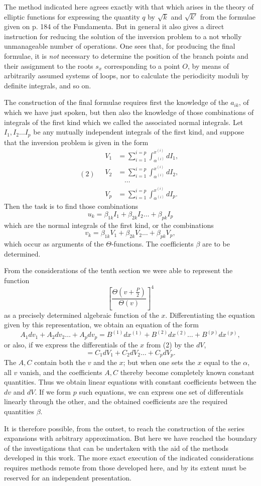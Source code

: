 \documentclass[10pt]{article}
\begin{document}
The method indicated here agrees exactly with that which arises in the theory of elliptic functions for expressing the quantity \(q\) by \(\sqrt{k}\) and \(\sqrt{k'}\) from the formulae given on p. 184 of the Fundamenta. But in general it also gives a direct instruction for reducing the solution of the inversion problem to a not wholly unmanageable number of operations. One sees that, for producing the final formulae, it is \emph{not} necessary to determine the position of the branch points and their assignment to the roots \(s_x\) corresponding to a point \(O\), by means of arbitrarily assumed systems of loops, nor to calculate the periodicity moduli by definite integrals, and so on.

The construction of the final formulae requires first the knowledge of the \(a_{ik}\), of which we have just spoken, but then also the knowledge of those combinations of integrals of the first kind which we called the associated normal integrals. Let \(I_1,I_2\ldots I_p\) be any mutually independent integrals of the first kind, and suppose that the inversion problem is given in the form
\[
(2)\quad
\begin{aligned}
V_1&=\sum_{i=1}^{i=p}\int_{\alpha^{(i)}}^{x^{(i)}}dI_1,\\
V_2&=\sum_{i=1}^{i=p}\int_{\alpha^{(i)}}^{x^{(i)}}dI_2,\\[-0.25em]
&\quad\cdots\\[-0.25em]
V_p&=\sum_{i=1}^{i=p}\int_{\alpha^{(i)}}^{x^{(i)}}dI_p.
\end{aligned}
\]
Then the task is to find those combinations
\[
u_k=\beta_{1k}I_1+\beta_{2k}I_2\ldots+\beta_{pk}I_p
\]
which are the normal integrals of the first kind, or the combinations
\[
v_k=\beta_{1k}V_1+\beta_{2k}V_2\ldots+\beta_{pk}V_p,
\]
which occur as arguments of the \(\Theta\)-functions. The coefficients \(\beta\) are to be determined.

From the considerations of the tenth section we were able to represent the function
\[
\left[\frac{\Theta\left(v+\frac P2\right)}{\Theta(v)}\right]^4
\]
as a precisely determined algebraic function of the \(x\). Differentiating the equation given by this representation, we obtain an equation of the form
\[
A_1dv_1+A_2dv_2\ldots+A_pdv_p=B^{(1)}dx^{(1)}+B^{(2)}dx^{(2)}\ldots+B^{(p)}dx^{(p)},
\]
or also, if we express the differentials of the \(x\) from (2) by the \(dV\),
\[
=C_1dV_1+C_2dV_2\ldots+C_pdV_p.
\]
The \(A,C\) contain both the \(v\) and the \(x\); but when one sets the \(x\) equal to the \(\alpha\), all \(v\) vanish, and the coefficients \(A,C\) thereby become completely known constant quantities. Thus we obtain linear equations with constant coefficients between the \(dv\) and \(dV\). If we form \(p\) such equations, we can express one set of differentials linearly through the other, and the obtained coefficients are the required quantities \(\beta\).

It is therefore possible, from the outset, to reach the construction of the series expansions with arbitrary approximation. But here we have reached the boundary of the investigations that can be undertaken with the aid of the methods developed in this work. The more exact execution of the indicated considerations requires methods remote from those developed here, and by its extent must be reserved for an independent presentation.
\end{document}
